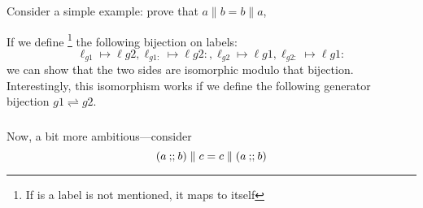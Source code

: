 Consider a simple example: prove that $a \parallel b = b \parallel a$,


If we define%
\footnote{If is a label is not mentioned, it maps to itself}
the following bijection on labels:
\[
  \ell_{g1} \mapsto \ell{g2}
, \ell_{g1:} \mapsto \ell{g2:}
, \ell_{g2} \mapsto \ell{g1}
, \ell_{g2:} \mapsto \ell{g1:}
\]
we can show that the two sides are isomorphic modulo that bijection.
Interestingly, this isomorphism works if we define the following
generator bijection $g1 \rightleftharpoons g2$.

\subsubsection{}

Now, a bit more ambitious---consider
\[ (a \mathbin{;\!;} b)\parallel c
    = c \parallel (a \mathbin{;\!;} b)
\]

